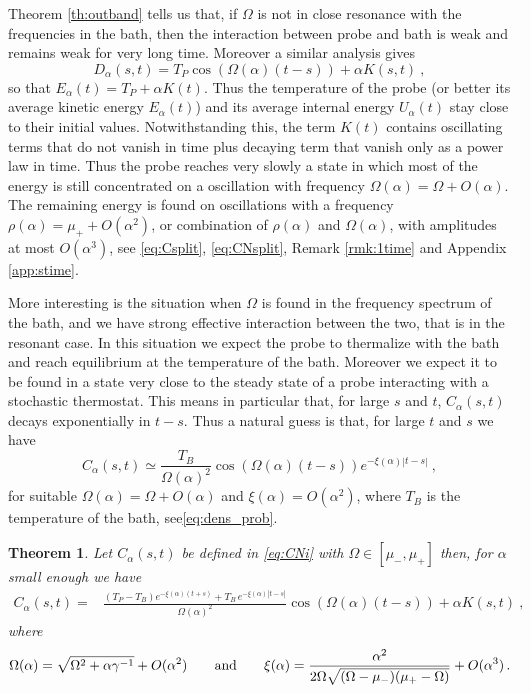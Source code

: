 \documentclass[11pt]{article}
\numberwithin{equation}{section}
\newtheorem{theo}{Theorem}
\numberwithin{theorem}{section}
\begin{document}
Theorem \ref{th:outband} tells us that, if $\Omega$ is not in close resonance with the frequencies in the bath, then the
interaction between probe and bath is weak and remains weak for very long time.  Moreover a similar analysis gives
\[
 D_\alpha(s,t)=T_P
\cos(\Omega(\alpha)(t-s))+\alpha K(s,t)\ ,
\]
so that $E_\alpha(t)=T_P+\alpha K(t)$. Thus the temperature of the probe (or better its average kinetic energy
$E_\alpha(t)$) and its average internal energy $U_\alpha(t)$ stay close to their initial values.
Notwithstanding this, the term $K(t)$ contains oscillating terms that do not vanish in time plus decaying term that
vanish only as a power law in time. Thus the probe reaches very slowly a state in which most of the energy is still
concentrated on a oscillation with frequency $\Omega(\alpha)=\Omega+O(\alpha)$. The remaining energy
is found on oscillations with a frequency $\rho(\alpha)=\mu_++O(\alpha^2)$, or combination of $\rho(\alpha)$ and 
$\Omega(\alpha)$, with amplitudes at most $O(\alpha^3)$, see \eqref{eq:Csplit}, \eqref{eq:CNsplit}, Remark 
\ref{rmk:1time} and Appendix \ref{app:stime}.

More interesting is the situation when $\Omega$ is found in the frequency spectrum of the bath, and we have strong
effective interaction between the two, that is in the resonant case. In this situation we expect the probe
to thermalize with the bath and reach equilibrium at the temperature of the bath. Moreover we expect it to be
found in a state very close to the steady state of a probe interacting with a stochastic thermostat. This means in 
particular that, for 
large $s$ and $t$, $C_\alpha(s,t)$ decays exponentially in $t-s$. Thus a natural guess is that, for large $t$ and $s$ 
we have
\[
 C_\alpha(s,t)\simeq
 \frac{T_B}{\Omega(\alpha)^2}\cos(\Omega(\alpha)(t-s))
 e^{-\xi(\alpha)|t-s|}\ ,
\]
for suitable $\Omega(\alpha)=\Omega+O(\alpha)$ and $\xi(\alpha)=O(\alpha^2)$, where $T_B$ is the temperature of the bath, see\eqref{eq:dens_prob}.

\begin{theo}\label{th:inband} Let $C_\alpha(s,t)$ be defined in \eqref{eq:CNi}
 with $\Omega\in[\mu_-,\mu_+]$ then, for $\alpha$ small enough we have
\begin{equation}\label{eq:Cdstimain}
\begin{aligned}
 C_\alpha(s,t)=&\frac{(T_P-T_B)
e^{-\xi(\alpha)(t+s)}+T_B\, e^{-\xi(\alpha)|t-s|}}{\Omega(\alpha)^2}
\cos(\Omega(\alpha)(t-s))+\alpha K(s,t)\ ,
\end{aligned}
\end{equation}
%
where
\[
\Omega(\alpha)=\sqrt{\Omega^2+\alpha\gamma^{-1}}+O(\alpha^2)\qquad\hbox{and}\qquad
\xi(\alpha)=\frac{\alpha^2}{2\Omega\sqrt{(\Omega-\mu_-)(\mu_+-\Omega)}}+O(\alpha^3)\, .
\]
\end{theo}
\end{document}
